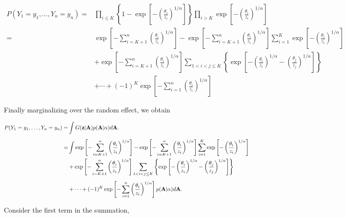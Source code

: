\begin{align} \label{joint_cond}
  P(Y_1=y_1,\ldots,Y_n=y_n) =& \prod_{ i \le K } \left\{ 1 - \exp \left[ - \left( \frac{ \theta_i }{ z_i } \right)^{ 1/\alpha} \right] \right \} \prod_{ i > K } \exp \left[ -\left( \frac{ \theta_i }{ z_i } \right)^{1/\alpha} \right] \nonumber \\[0.5em]
    =& \exp \left[ -\sum_{ i = K+1}^{ n }\left( \frac{ \theta_i }{ z_i } \right)^{1/\alpha} \right] - \exp \left[ -\sum_{ i = K+1}^{ n }\left( \frac{ \theta_i }{ z_i } \right)^{1/\alpha} \right] \sum_{ i = 1}^{K} \exp\left[ -\left( \frac{ \theta_i }{ z_i } \right)^{ 1/\alpha} \right] \nonumber\\
    &  + \exp \left[ -\sum_{ i = K+1}^{ n }\left( \frac{ \theta_i }{ z_i } \right)^{1/\alpha} \right] \sum_{ 1 < i < j \le K } \left\{ \exp \left[ - \left( \frac{ \theta_i }{ z_i } \right)^{ 1/\alpha} - \left( \frac{ \theta_j }{ z_j } \right)^{ 1/\alpha } \right] \right \} \nonumber \\[0.5em]
    & + \cdots + (-1)^K \exp\left[ - \sum_{ i = 1 }^{ n }\left( \frac{ \theta_i }{ z_i } \right)^{ 1/\alpha} \right]
\end{align}

Finally marginalizing over the random effect, we obtain

\begin{align} \label{joint}
    P(Y_1=y_1,\ldots,Y_n=y_n) =&\int G(\mathbf{z} | \mathbf{A}) p( \mathbf{A} | \alpha) d\mathbf{A}. \nonumber\\[0.5em]
      =& \int \exp \left[ -\sum_{ i = K+1}^{ n }\left( \frac{ \theta_i }{ z_i } \right)^{1/\alpha} \right] - \exp \left[ -\sum_{ i = K+1}^{ n }\left( \frac{ \theta_i }{ z_i } \right)^{1/\alpha} \right] \sum_{ i = 1}^{K} \exp\left[ -\left( \frac{ \theta_i }{ z_i } \right)^{ 1/\alpha} \right] \nonumber\\
    &  + \exp \left[ -\sum_{ i = K+1}^{ n }\left( \frac{ \theta_i }{ z_i } \right)^{1/\alpha} \right] \sum_{ 1 < i < j \le K } \left\{ \exp \left[ - \left( \frac{ \theta_i }{ z_i } \right)^{ 1/\alpha} - \left( \frac{ \theta_j }{ z_j } \right)^{ 1/\alpha } \right] \right \} \nonumber \\[0.5em]
    & + \cdots + (-1)^K \exp\left[ - \sum_{ i = 1 }^{ n }\left( \frac{ \theta_i }{ z_i } \right)^{ 1/\alpha} \right] p( \mathbf{A} | \alpha) d\mathbf{A}.
\end{align}

Consider the first term in the summation,

